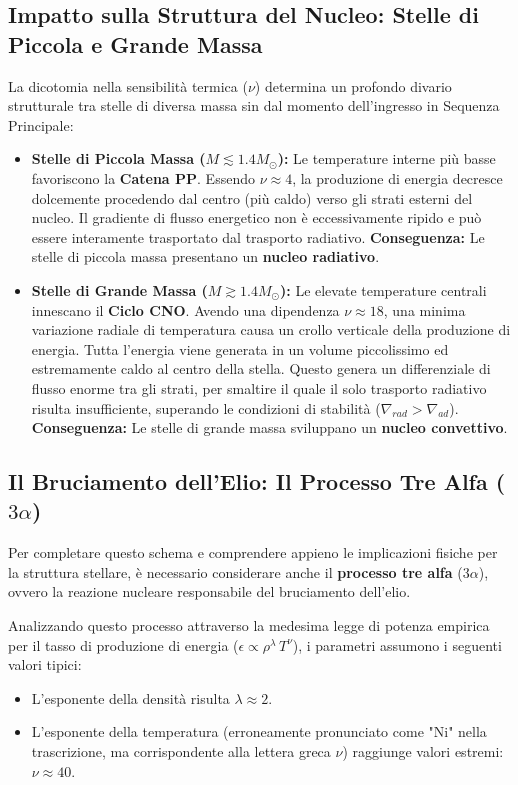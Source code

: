 \subsection{Impatto sulla Struttura del Nucleo: Stelle di Piccola e Grande Massa}

La dicotomia nella sensibilità termica ($\nu$) determina un profondo divario strutturale tra stelle di diversa massa sin dal momento dell'ingresso in Sequenza Principale:

\begin{itemize}
\item \textbf{Stelle di Piccola Massa ($M \lesssim 1.4 M_\odot$):}
Le temperature interne più basse favoriscono la \textbf{Catena PP}. Essendo $\nu \approx 4$, la produzione di energia decresce dolcemente procedendo dal centro (più caldo) verso gli strati esterni del nucleo. Il gradiente di flusso energetico non è eccessivamente ripido e può essere interamente trasportato dal trasporto radiativo.
\textbf{Conseguenza:} Le stelle di piccola massa presentano un \textbf{nucleo radiativo}.


\item \textbf{Stelle di Grande Massa ($M \gtrsim 1.4 M_\odot$):} 
Le elevate temperature centrali innescano il \textbf{Ciclo CNO}. Avendo una dipendenza $\nu \approx 18$, una minima variazione radiale di temperatura causa un crollo verticale della produzione di energia. Tutta l'energia viene generata in un volume piccolissimo ed estremamente caldo al centro della stella. Questo genera un differenziale di flusso enorme tra gli strati, per smaltire il quale il solo trasporto radiativo risulta insufficiente, superando le condizioni di stabilità ($\nabla_{rad} > \nabla_{ad}$). 
\textbf{Conseguenza:} Le stelle di grande massa sviluppano un \textbf{nucleo convettivo}.

\end{itemize}

\subsection{Il Bruciamento dell'Elio: Il Processo Tre Alfa ($3\alpha$)}

Per completare questo schema e comprendere appieno le implicazioni fisiche per la struttura stellare, è necessario considerare anche il \textbf{processo tre alfa} ($3\alpha$), ovvero la reazione nucleare responsabile del bruciamento dell'elio.

Analizzando questo processo attraverso la medesima legge di potenza empirica per il tasso di produzione di energia ($\epsilon \propto \rho^{\lambda} \, T^{\nu}$), i parametri assumono i seguenti valori tipici:
\begin{itemize}
\item L'esponente della densità risulta $\lambda \approx 2$.
\item L'esponente della temperatura (erroneamente pronunciato come "Ni" nella trascrizione, ma corrispondente alla lettera greca $\nu$) raggiunge valori estremi: \textbf{$\nu \approx 40$}.
\end{itemize}

